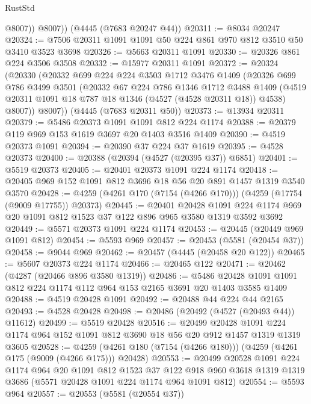 \begin{lexlean}{RustStd}
\begin{coremodule}
{\begin{coremodule}
{{{{{{{{{{{{{{{{{{{{{{{{{{{{{{{{{{{{{{            @8007))
        @8007))
    (@4445 (@7683 @20247 @44))
@20311 := @8034 @20247
@20324 := @7506 @20311 @1091 @1091 @50 @224 @861 @970 @812 @3510 @50 @3410 @3523 @3698
@20326 := @5663 @20311 @1091
@20330 := @20326 @861 @224 @3506 @3508
@20332 := @15977 @20311 @1091
@20372 := @20324
    (@20330
      (@20332
        @699
        @224
        @224
        @3503
        @1712
        @3476
        @1409
        (@20326
          @699
          @786
          @3499
          @3501
          (@20332
            @67
            @224
            @786
            @1346
            @1712
            @3488
            @1409
            (@4519 @20311 @1091 @18 @787 @18 @1346 (@4527 (@4528 @20311 @18)) @4538)
            @8007))
        @8007))
    (@4445 (@7683 @20311 @50))
@20373 := @13934 @20311
@20379 := @5486 @20373 @1091 @1091 @812 @224 @1174
@20388 := @20379 @119 @969 @153 @1619 @3697 @20 @1403 @3516 @1409
@20390 := @4519 @20373 @1091
@20394 := @20390 @37 @224 @37 @1619
@20395 := @4528 @20373
@20400 := @20388 (@20394 (@4527 (@20395 @37)) @6851)
@20401 := @5519 @20373
@20405 := @20401 @20373 @1091 @224 @1174
@20418 := @20405 @969 @152 @1091 @812 @3696 @18 @56 @20 @891 @1457 @1319 @3540 @3570
@20428 := @4259 (@4261 @170 (@7154 (@4266 @170))) (@4259 (@17754 (@9009 @17755)) @20373)
@20445 := @20401
    @20428
    @1091
    @224
    @1174
    @969
    @20
    @1091
    @812
    @1523
    @37
    @122
    @896
    @965
    @3580
    @1319
    @3592
    @3692
@20449 := @5571 @20373 @1091 @224 @1174
@20453 := @20445 (@20449 @969 @1091 @812)
@20454 := @5593 @969
@20457 := @20453 (@5581 (@20454 @37))
@20458 := @9044 @969
@20462 := @20457 (@4445 (@20458 @20 @122))
@20465 := @5607 @20373 @224 @1174
@20466 := @20465 @122
@20471 := @20462 (@4287 (@20466 @896 @3580 @1319))
@20486 := @5486 @20428 @1091 @1091 @812 @224 @1174 @112 @964 @153 @2165 @3691 @20 @1403 @3585 @1409
@20488 := @4519 @20428 @1091
@20492 := @20488 @44 @224 @44 @2165
@20493 := @4528 @20428
@20498 := @20486 (@20492 (@4527 (@20493 @44)) @11612)
@20499 := @5519 @20428
@20516 := @20499
    @20428
    @1091
    @224
    @1174
    @964
    @152
    @1091
    @812
    @3690
    @18
    @56
    @20
    @912
    @1457
    @1319
    @1319
    @3605
@20528 := @4259 (@4261 @180 (@7154 (@4266 @180))) (@4259 (@4261 @175 (@9009 (@4266 @175))) @20428)
@20553 := @20499
    @20528
    @1091
    @224
    @1174
    @964
    @20
    @1091
    @812
    @1523
    @37
    @122
    @918
    @960
    @3618
    @1319
    @1319
    @3686
    (@5571 @20428 @1091 @224 @1174 @964 @1091 @812)
@20554 := @5593 @964
@20557 := @20553 (@5581 (@20554 @37))
}}}}}}}}}}}}}}}}}}}}}}}}}}}}}}}}}}}}}}
\end{coremodule}}
\end{coremodule}
\end{lexlean}

